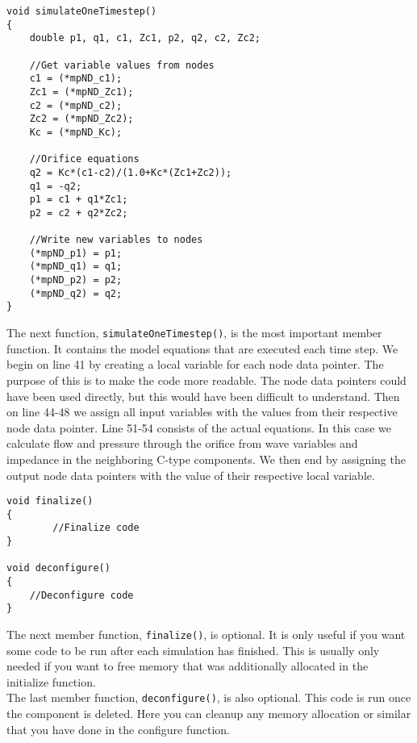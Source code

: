 \documentclass[a4paper,pdftex]{article}
\begin{document}
\begin{minipage}{\linewidth}
\begin{lstlisting}[firstnumber=39, basicstyle=\footnotesize\ttfamily]
void simulateOneTimestep()
{
    double p1, q1, c1, Zc1, p2, q2, c2, Zc2;

    //Get variable values from nodes
    c1 = (*mpND_c1);
    Zc1 = (*mpND_Zc1);
    c2 = (*mpND_c2);
    Zc2 = (*mpND_Zc2);
    Kc = (*mpND_Kc);

    //Orifice equations
    q2 = Kc*(c1-c2)/(1.0+Kc*(Zc1+Zc2));
    q1 = -q2;
    p1 = c1 + q1*Zc1;
    p2 = c2 + q2*Zc2;

    //Write new variables to nodes
    (*mpND_p1) = p1;
    (*mpND_q1) = q1;
    (*mpND_p2) = p2;
    (*mpND_q2) = q2;
}
\end{lstlisting}
\end{minipage}

\noindent The next function, \texttt{simulateOneTimestep()}, is the most important member function. 
It contains the model equations that are executed each time step. 
We begin on line 41 by creating a local variable for each node data pointer.
The purpose of this is to make the code more readable.
The node data pointers could have been used directly, but this would have been difficult to understand.
Then on line 44-48 we assign all input variables with the values from their respective node data pointer.
Line 51-54 consists of the actual equations. 
In this case we calculate flow and pressure through the orifice from wave variables and impedance in the neighboring C-type components. 
We then end by assigning the output node data pointers with the value of their respective local variable.

\begin{minipage}{\linewidth}
\begin{lstlisting}[firstnumber=62, basicstyle=\footnotesize\ttfamily]
void finalize()
{
      	//Finalize code
}

void deconfigure()
{
    //Deconfigure code
}
\end{lstlisting}
\end{minipage}

\noindent The next member function, \texttt{finalize()}, is optional. 
It is only useful if you want some code to be run after each simulation has finished. 
This is usually only needed if you want to free memory that was additionally allocated in the initialize function.\\
\newline
The last member function, \texttt{deconfigure()}, is also optional. 
This code is run once the component is deleted. 
Here you can cleanup any memory allocation or similar that you have done in the configure function. 
\end{document}
